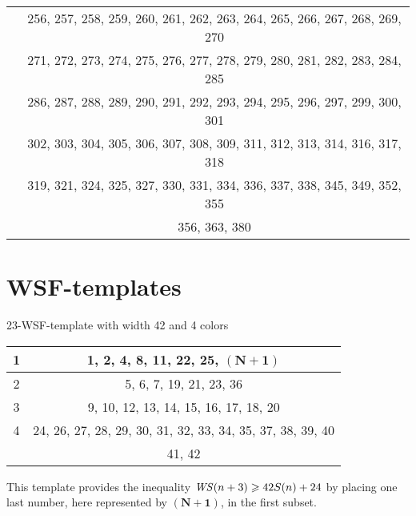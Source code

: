 \begin{center}
\begin{tabular}{|*{2}{c|}}
	& 256, 257, 258, 259, 260, 261, 262, 263, 264, 265, 266, 267, 268, 269, 270\\
	& 271, 272, 273, 274, 275, 276, 277, 278, 279, 280, 281, 282, 283, 284, 285\\
	& 286, 287, 288, 289, 290, 291, 292, 293, 294, 295, 296, 297, 299, 300, 301\\
	& 302, 303, 304, 305, 306, 307, 308, 309, 311, 312, 313, 314, 316, 317, 318\\
	& 319, 321, 324, 325, 327, 330, 331, 334, 336, 337, 338, 345, 349, 352, 355\\
	& 356, 363, 380\\
	\hline
\end{tabular}
\end{center}


\section{WSF-templates}

\begin{center}
23-WSF-template with width 42 and 4 colors \\

\begin{tabular}{|*{2}{c|}}
	\hline
	1 & 1, 2, 4, 8, 11, 22, 25, \(\mathbf{(N+1)}\)\\
	\hline
	2 & 5, 6, 7, 19, 21, 23, 36\\
	\hline
	3 & 9, 10, 12, 13, 14, 15, 16, 17, 18, 20\\
	\hline
	4 & 24, 26, 27, 28, 29, 30, 31, 32, 33, 34, 35, 37, 38, 39, 40\\
	& 41, 42\\
	\hline
\end{tabular}
\end{center}

This template provides the inequality \(\mathit{WS} (n+3) \geqslant 42S(n) + 24\)
by placing one last number, here represented by \(\mathbf{(N+1)}\), in the first subset.

\resetarraystretch


